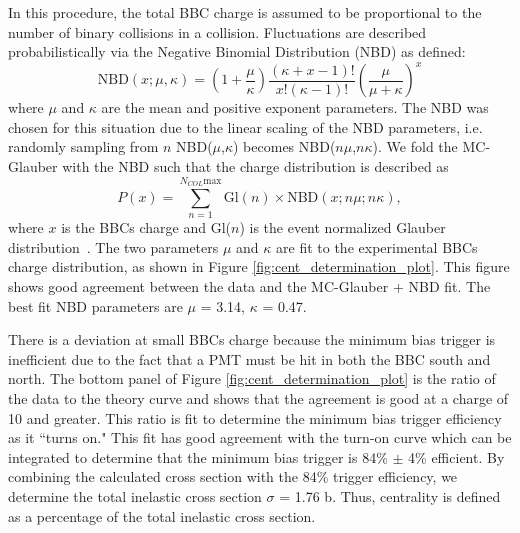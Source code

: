 In this procedure, the total BBC charge is assumed to be proportional to the number of binary collisions in a \pau collision. Fluctuations are described probabilistically via the Negative Binomial Distribution (NBD) as defined:
\begin{equation}
   \textrm{NBD}(x;\mu,\kappa) = \left(1+\frac{\mu}{\kappa}\right)\frac{(\kappa+x-1)!}{x!(\kappa-1)!}\left(\frac{\mu}{\mu+\kappa}\right)^x
\end{equation}
where $\mu$ and $\kappa$ are the mean and positive exponent parameters. The NBD was chosen for this situation due to the linear scaling of the NBD parameters, i.e. randomly sampling from $n$ NBD($\mu$,$\kappa$) becomes NBD($n\mu$,$n\kappa$). We fold the MC-Glauber with the NBD such that the charge distribution is described as
\begin{equation}
   P(x) = \sum^{N_{COL}\textrm{max}}_{n=1} \textrm{Gl}(n)\times \textrm{NBD}(x;n\mu;n\kappa),
\end{equation}
where $x$ is the BBCs charge and Gl($n$) is the event normalized Glauber distribution~\cite{PhysRevC.90.034902}. The two parameters $\mu$ and $\kappa$ are fit to the experimental BBCs charge distribution, as shown in Figure \ref{fig:cent_determination_plot}. This figure shows good agreement between the data and the MC-Glauber + NBD fit. The best fit NBD parameters are $\mu$ = 3.14, $\kappa$ = 0.47. 

There is a deviation at small BBCs charge because the minimum bias trigger is inefficient due to the fact that a PMT must be hit in both the BBC south and north. The bottom panel of Figure \ref{fig:cent_determination_plot} is the ratio of the data to the theory curve and shows that the agreement is good at a charge of 10 and greater. This ratio is fit to determine the minimum bias trigger efficiency as it ``turns on." This fit has good agreement with the turn-on curve which can be integrated to determine that the minimum bias trigger is 84\% $\pm$ 4\% efficient. By combining the calculated \pau cross section with the 84\% trigger efficiency, we determine the total inelastic \pau cross section $\sigma$ = 1.76 b. Thus, centrality is defined as a percentage of the total inelastic cross section.

